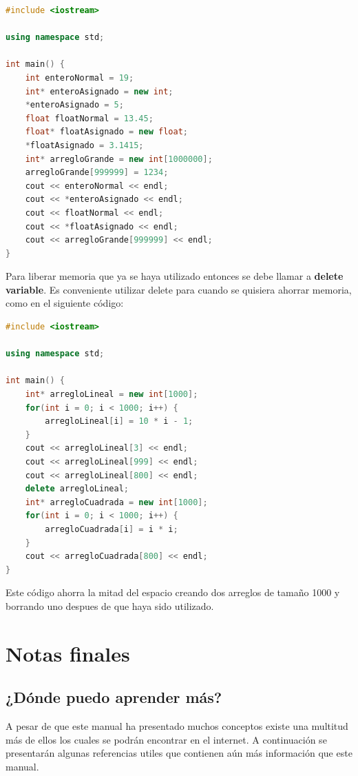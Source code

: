 \documentclass{article}
\begin{document}
\begin{lstlisting}[language=C++, caption=Asignando variables]
#include <iostream>

using namespace std;

int main() {
    int enteroNormal = 19;
    int* enteroAsignado = new int;
    *enteroAsignado = 5;
    float floatNormal = 13.45;
    float* floatAsignado = new float;
    *floatAsignado = 3.1415;
    int* arregloGrande = new int[1000000];
    arregloGrande[999999] = 1234;
    cout << enteroNormal << endl;
    cout << *enteroAsignado << endl;
    cout << floatNormal << endl;
    cout << *floatAsignado << endl;
    cout << arregloGrande[999999] << endl;
}    
\end{lstlisting}

Para liberar memoria que ya se haya utilizado entonces se debe llamar a \textbf{delete variable}. Es conveniente utilizar delete para cuando se quisiera ahorrar memoria, como en el siguiente código:

\begin{lstlisting}[language=C++, caption=Borrando datos]
#include <iostream>

using namespace std;

int main() {
    int* arregloLineal = new int[1000];
    for(int i = 0; i < 1000; i++) {
        arregloLineal[i] = 10 * i - 1;
    }
    cout << arregloLineal[3] << endl;
    cout << arregloLineal[999] << endl;
    cout << arregloLineal[800] << endl;
    delete arregloLineal;
    int* arregloCuadrada = new int[1000];
    for(int i = 0; i < 1000; i++) {
        arregloCuadrada[i] = i * i;
    }
    cout << arregloCuadrada[800] << endl;
}     
\end{lstlisting}

Este código ahorra la mitad del espacio creando dos arreglos de tamaño 1000 y borrando uno despues de que haya sido utilizado.

\section{Notas finales}

\subsection{¿Dónde puedo aprender más?}

A pesar de que este manual ha presentado muchos conceptos existe una multitud más de ellos los cuales se podrán encontrar en el internet. A continuación se presentarán algunas referencias utiles que contienen aún más información que este manual.
\end{document}
